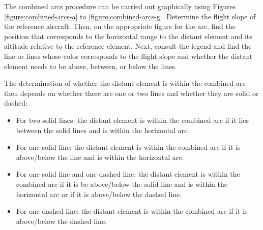 

The combined arcs procedure can be carried out graphically using Figures \ref{figure:combined-arcs-a} to \ref{figure:combined-arcs-g}. Determine the flight slope of the reference aircraft. Then, on the appropriate figure for the arc, find the position that corresponds to the horizontal range to the distant element and its altitude relative to the reference element. Next, consult the legend and find the line or lines whose color corresponds to the flight slope and whether the distant element needs to be above, between, or below the lines.

The determination of whether the distant element is within the combined arc then depends on whether there are one or two lines and whether they are solid or dashed:

\begin{itemize}
    \item For two solid lines: the distant element is within the combined arc if it lies between the solid lines and is within the horizontal arc.
    \item For one solid line: the distant element is within the combined arc if it is above/below the line and is within the horizontal arc.
    \item For one solid line and one dashed line: the distant element is within the combined arc if it is be above/below the solid line and is within the horizontal arc or if it is above/below the dashed line.
    \item For one dashed line: the distant element is within the combined arc if it is above/below the dashed line.
\end{itemize}

